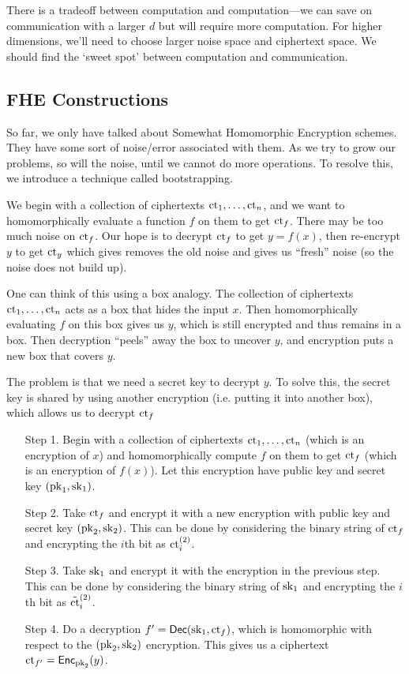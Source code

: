 There is a tradeoff between computation and computation---we can save on communication with a larger $d$ but will require more computation. For higher dimensions, we'll need to choose larger noise space and ciphertext space. We should find the `sweet spot' between computation and communication.

\subsection{FHE Constructions}

So far, we only have talked about Somewhat Homomorphic Encryption schemes. They have some sort of noise/error associated with them. As we try to grow our problems, so will the noise, until we cannot do more operations. To resolve this, we introduce a technique called bootstrapping.

We begin with a collection of ciphertexts $\mathrm{ct}_1, \dots, \mathrm{ct}_n$, and we want to homomorphically evaluate a function $f$ on them to get $\mathrm{ct}_f$. There may be too much noise on $\mathrm{ct}_f$. Our hope is to decrypt $\mathrm{ct}_f$ to get $y= f(x)$, then re-encrypt $y$ to get $\mathrm{ct}_y$ which gives removes the old noise and gives us ``fresh'' noise (so the noise does not build up).

\begin{center}
    \def\svgwidth{0.55\columnwidth}
    
\end{center}

One can think of this using a box analogy. The collection of ciphertexts $\mathrm{ct}_1, \dots, \mathrm{ct}_n$ acts as a box that hides the input $x$. Then homomorphically evaluating $f$ on this box gives us $y$, which is still encrypted and thus remains in a box. Then decryption ``peels'' away the box to uncover $y$, and encryption puts a new box that covers $y$.

The problem is that we need a secret key to decrypt $y$. To solve this, the secret key is shared by using another encryption (i.e. putting it into another box), which allows us to decrypt $\mathrm{ct}_f$

\begin{enumerate}
    \item[Step 1.] Begin with a collection of ciphertexts $\mathrm{ct}_1, \dots, \mathrm{ct}_n$ (which is an encryption of $x$) and homomorphically compute $f$ on them to get $\mathrm{ct}_f$ (which is an encryption of $f(x)$). Let this encryption have public key and secret key $(\mathrm{pk}_1, \mathrm{sk}_1)$.
    \item[Step 2.] Take $\mathrm{ct}_f$ and encrypt it with a new encryption with public key and secret key $(\mathrm{pk}_2, \mathrm{sk}_2)$. This can be done by considering the binary string of $\mathrm{ct}_f$ and encrypting the $i$th bit as $\mathrm{ct}_i^{(2)}$.
    \item[Step 3.] Take $\mathrm{sk}_1$ and encrypt it with the encryption in the previous step. This can be done by considering the binary string of $\mathrm{sk}_1$ and encrypting the $i$th bit as $\tilde{\mathrm{ct}}_i^{(2)}$.
    \item[Step 4.] Do a decryption $f' = \operatorname{\mathsf{Dec}}(\mathrm{sk}_1, \mathrm{ct}_f)$, which is homomorphic with respect to the $(\mathrm{pk}_2, \mathrm{sk}_2)$ encryption. This gives us a ciphertext $\mathrm{ct}_{f'} = \operatorname{\mathsf{Enc}}_{\mathrm{pk}_2}(y)$.
\end{enumerate}

